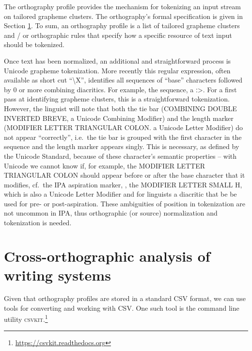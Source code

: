 The orthography profile provides the mechanism for tokenizing an input stream on
tailored grapheme clusters. The orthography's formal specification is given in
Section \ref{}. To sum, an orthography profile is a list of tailored grapheme
clusters and / or orthographic rules that specify how a specific resource of
text input should be tokenized. 

Once text has been normalized, an additional and straightforward process is
Unicode grapheme tokenization. More recently this regular expression, often
available as short cut ``\textbackslash{X}'', identifies all sequences of
``base'' characters followed by 0 or more combining diacritics. For example, the
sequence, %
a ː>. For a first pass at identifying grapheme clusters, this is a
straightforward tokenization. However, the linguist will note that both the tie
bar (COMBINING DOUBLE INVERTED BREVE, a Unicode Combining Modifier) and the
length marker (MODIFIER LETTER TRIANGULAR COLON. a Unicode Letter Modifier) do
not appear ``correctly'', i.e.~the tie bar is grouped with the first character
in the sequence and the length marker appears singly. This is necessary, as
defined by the Unicode Standard, because of these character's semantic
properties -- with Unicode we cannot know if, for example, the MODIFIER LETTER
TRIANGULAR COLON should appear before or after the base character that it
modifies, cf.~the IPA aspiration marker, , the MODIFIER LETTER SMALL H, which is
also a Unicode Letter Modifier and for linguists a diacritic that be be used for
pre- or post-aspiration. These ambiguities of position in tokenization are not
uncommon in IPA, thus orthographic (or source) normalization and tokenization is
needed.

\section{Cross-orthographic analysis of writing systems}

Given that orthography profiles are stored in a standard CSV format, we can use tools for converting and working with CSV. One such tool is the command line utility \textsc{csvkit}.\footnote{\url{https://csvkit.readthedocs.org}}


